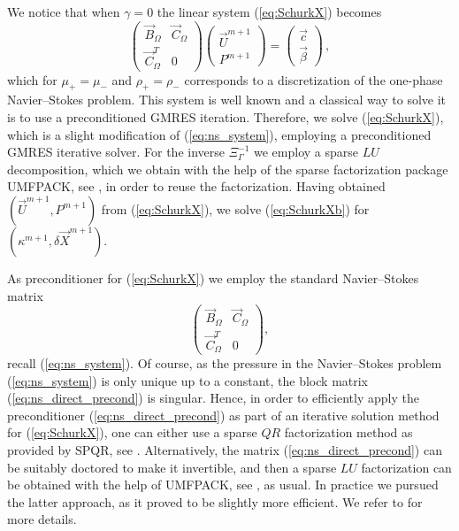 \documentclass[a4paper,12pt,onecolumn]{article}
\begin{document}
We notice that when $\gamma = 0$ the linear system (\ref{eq:SchurkX}) becomes
\begin{equation} \label{eq:ns_system}
\begin{pmatrix}
\vec B_\Omega & \vec C_\Omega \\
\vec C_\Omega^T & 0
\end{pmatrix}
\begin{pmatrix}
\vec U^{m+1} \\ P^{m+1}
\end{pmatrix}
= \begin{pmatrix}
\vec c \\
\vec \beta
\end{pmatrix}\,,
\end{equation}
which for $\mu_+=\mu_-$ and $\rho_+ = \rho_-$
corresponds to a discretization of the one-phase
Navier--Stokes problem. This system is well known and a classical way to solve
it is to use a preconditioned GMRES iteration. Therefore, we solve
(\ref{eq:SchurkX}), which is a slight modification of (\ref{eq:ns_system}),
employing a preconditioned GMRES iterative solver. For the inverse
$\Xi_\Gamma^{-1}$ we employ a sparse $LU$ decomposition, which we obtain with
the help of the sparse factorization package UMFPACK, see \cite{Davis04}, in
order to reuse the factorization. Having obtained $(\vec U^{m+1}, P^{m+1})$ from
(\ref{eq:SchurkX}), we solve (\ref{eq:SchurkXb}) for $(\kappa^{m+1}, \delta\vec
X^{m+1})$.

As preconditioner for (\ref{eq:SchurkX})
we employ the standard Navier--Stokes matrix
\begin{equation}\label{eq:ns_direct_precond}
\begin{pmatrix} \vec B_\Omega & \vec C_\Omega \\
\vec C_\Omega^T & 0 \end{pmatrix},
\end{equation}
recall (\ref{eq:ns_system}).
Of course, as the pressure in the Navier--Stokes problem
(\ref{eq:ns_system}) is only unique up to a constant, the block matrix
(\ref{eq:ns_direct_precond}) is singular. Hence, in order to efficiently apply
the preconditioner (\ref{eq:ns_direct_precond}) as part of an iterative
solution method for (\ref{eq:SchurkX}), one can either use a sparse $QR$
factorization method as provided by SPQR, see \cite{Davis11}. Alternatively,
the matrix (\ref{eq:ns_direct_precond}) can be suitably doctored to make it
invertible, and then a sparse $LU$ factorization can be obtained with the help
of UMFPACK, see \cite{Davis04}, as usual. In practice we pursued the latter
approach, as it proved to be slightly more efficient. We refer to
\cite[\S4.6]{Agnese} for more details.
\end{document}
